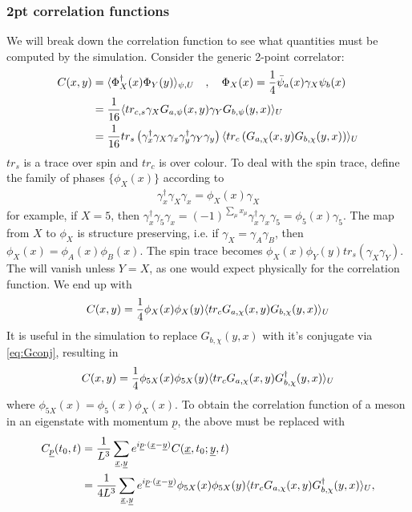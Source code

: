 \documentclass[a4paper,10pt]{article}
\numberwithin{equation}{section}
\begin{document}
\subsubsection{2pt correlation functions}
We will break down the correlation function to see what quantities must be computed by the simulation. Consider the generic 2-point correlator:
\begin{align}
	C(x,y) &= \langle \Phi^{\dagger}_X(x) \Phi_Y(y) \rangle_{\psi,U} \quad , \quad \Phi_X(x) = {1\over 4}\bar{\psi}_a(x) \gamma_X \psi_b(x) \\
	&= {1\over 16}\langle tr_{c,s} \gamma_X G_{a,\psi}(x,y) \gamma_Y G_{b,\psi}(y,x) \rangle_U \\
	&= {1\over 16}tr_s \left( \gamma^{\dagger}_x \gamma_X \gamma_x \gamma_y^{\dagger} \gamma_Y \gamma_y \right)
	\langle tr_c \left( G_{a,\chi}(x,y) G_{b,\chi}(y,x) \right) \rangle_U
\end{align}
$tr_s$ is a trace over spin and $tr_c$ is over colour. To deal with the spin trace, define the family of phases $\{\phi_X(x)\}$ according to
\begin{align}
	\gamma^{\dagger}_x\gamma_X\gamma_x = \phi_X(x) \gamma_X
\end{align}
for example, if $X=5$, then $\gamma^{\dagger}_x\gamma_5\gamma_x = (-1)^{\sum_{\mu}x_{\mu}} \gamma^{\dagger}_x\gamma_x \gamma_5 = \phi_5(x) \gamma_5$. The map from $X$ to $\phi_X$ is structure preserving, i.e. if $\gamma_X=\gamma_A\gamma_B$, then $\phi_X(x)=\phi_A(x)\phi_B(x)$. The spin trace becomes $\phi_X(x)\phi_Y(y) tr_s\left( \gamma_X \gamma_Y \right)$. The will vanish unless $Y=X$, as one would expect physically for the correlation function. We end up with
\begin{align}
	C(x,y) = {1\over 4} \phi_X(x)\phi_X(y) \langle tr_c G_{a,\chi}(x,y) G_{b,\chi}(y,x) \rangle_U
\end{align}
It is useful in the simulation to replace $G_{b,\chi}(y,x)$ with it's conjugate via \eqref{eq:Gconj}, resulting in
\begin{align}
	C(x,y) = {1\over 4} \phi_{5X}(x)\phi_{5X}(y) \langle tr_c G_{a,\chi}(x,y) G^{\dagger}_{b,\chi}(y,x) \rangle_U
\end{align}
where $\phi_{5X}(x) = \phi_5(x)\phi_X(x)$. To obtain the correlation function of a meson in an eigenstate with momentum ${\underline{p}}$, the above must be replaced with
\begin{align}
	C_{\underline{p}}(t_0,t) &= {1\over L^3} \sum_{\underline{x},\underline{y}} e^{i\underline{p}\cdot(\underline{x}-\underline{y})}
	C(\underline{x},t_0;\underline{y},t) \\
	&= {1\over 4 L^3} \sum_{\underline{x},\underline{y}} e^{i\underline{p}\cdot(\underline{x}-\underline{y})} \phi_{5X}(x)\phi_{5X}(y) \langle tr_c G_{a,\chi}(x,y)G^{\dagger}_{b,\chi}(y,x)\rangle_U,
\end{align}
\end{document}
